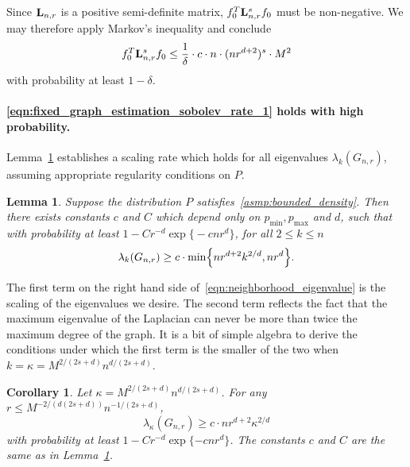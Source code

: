 \documentclass{article}
\newcommand{\1}{\mathbf{1}}
\newcommand{\Lap}{{\bf L}}
\theoremstyle{alden}
\theoremstyle{aldenthm}
\newtheorem{lemma}{Lemma}
\newtheorem{corollary}{Corollary}
\theoremstyle{definition}
\theoremstyle{remark}
\begin{document}
Since $\Lap_{n,r}$ is a positive semi-definite matrix, $f_0^T \Lap_{{n,r}}^s f_0$ must be non-negative. We may therefore apply Markov's inequality and conclude
\begin{equation}
\label{eqn:roughness_functional_probability_sobolev}
f_0^T \Lap_{{n,r}}^s f_0 \leq  \frac{1}{\delta} \cdot c \cdot n \cdot (nr^{d+2})^s \cdot M^2
\end{equation}
with probability at least $1 - \delta$.

\paragraph{\eqref{eqn:fixed_graph_estimation_sobolev_rate_1} holds with high probability.}

Lemma~\ref{lem:neighborhood_eigenvalue} establishes a scaling rate which holds for all eigenvalues $\lambda_{k}(G_{n,r})$, assuming appropriate regularity conditions on $P$.
\begin{lemma}
	\label{lem:neighborhood_eigenvalue}
	Suppose the distribution $P$ satisfies~\ref{asmp:bounded_density}. Then there exists constants $c$ and $C$ which depend only on $p_{\min}, p_{\max}$ and $d$, such that with probability at least $1 - C r^{-d} \exp\bigl\{- c n r^d\bigr\}$, for all $2 \leq k \leq n$
	\begin{equation}
	\label{eqn:neighborhood_eigenvalue}
	\lambda_k(G_{n,r}) \geq c \cdot \min\Bigl\{nr^{d + 2}k^{2/d}, nr^d\Bigr\}.
	\end{equation}	
\end{lemma}
The first term on the right hand side of~\eqref{eqn:neighborhood_eigenvalue} is the scaling of the eigenvalues we desire. The second term reflects the fact that the maximum eigenvalue of the Laplacian can never be more than twice the maximum degree of the graph. It is a bit of simple algebra to derive the conditions under which the first term is the smaller of the two when $k = \kappa = M^{2/(2s + d)} n^{d/(2s + d)}$.
\begin{corollary}
	\label{cor:neighborhood_eigenvalue}
	Let $\kappa = M^{2/(2s + d)} n^{d/(2s + d)}$. For any $r \leq M^{-2/(d(2s +d))} n^{-1/(2s + d)}$, 
	\begin{equation}
	\label{eqn:neighborhood_eigenvalue_1}
	\lambda_{\kappa}(G_{n,r}) \geq c \cdot nr^{d+2}{\kappa}^{2/d}
	\end{equation}
	with probability at least $1 - C r^{-d} \exp\{- c n r^d\}$. The constants $c$ and $C$ are the same as in Lemma~\ref{lem:neighborhood_eigenvalue}.
\end{corollary}
\end{document}
